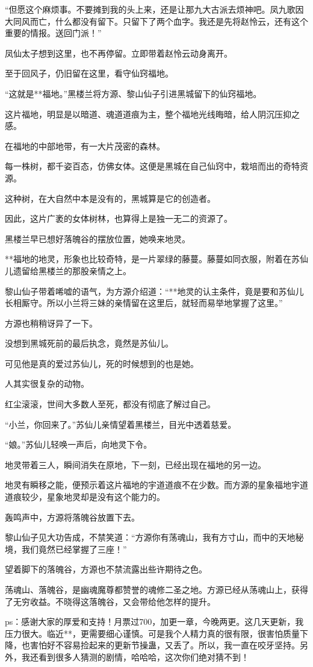 \begin{this_body}
“但愿这个麻烦事。不要摊到我的头上来，还是让那九大古派去烦神吧。凤九歌因大同风而亡，什么都没有留下。只留下了两个血字。我还是先将赵怜云，还有这个重要的情报。送回门派！”

凤仙太子想到这里，也不再停留。立即带着赵怜云动身离开。

至于回风子，仍旧留在这里，看守仙窍福地。

“这就是**福地。”黑楼兰将方源、黎山仙子引进黑城留下的仙窍福地。

这片福地，明显是以暗道、魂道道痕为主，整个福地光线晦暗，给人阴沉压抑之感。

在福地的中部地带，有一大片茂密的森林。

每一株树，都千姿百态，仿佛女体。这便是黑城在自己仙窍中，栽培而出的奇特资源。

这种树，在大自然中本是没有的，黑城算是它的创造者。

因此，这片广袤的女体树林，也算得上是独一无二的资源了。

黑楼兰早已想好落魄谷的摆放位置，她唤来地灵。

**福地的地灵，形象也比较奇特，是一片翠绿的藤蔓。藤蔓如同衣服，附着在苏仙儿遗留给黑楼兰的那股亲情之上。

黎山仙子带着唏嘘的语气，为方源介绍道：“**地灵的认主条件，竟是要和苏仙儿长相厮守。所以小兰将三妹的亲情留在这里后，就轻而易举地掌握了这里。”

方源也稍稍讶异了一下。

没想到黑城死前的最后执念，竟然是苏仙儿。

可见他是真的爱过苏仙儿，死的时候想到的也是她。

人其实很复杂的动物。

红尘滚滚，世间大多数人至死，都没有彻底了解过自己。

“小兰，你回来了。”苏仙儿亲情望着黑楼兰，目光中透着慈爱。

“娘。”苏仙儿轻唤一声后，向地灵下令。

地灵带着三人，瞬间消失在原地，下一刻，已经出现在福地的另一边。

地灵有瞬移之能，便预示着这片福地的宇道道痕不在少数。而方源的星象福地宇道道痕较少，星象地灵却是没有这个能力的。

轰鸣声中，方源将落魄谷放置下去。

黎山仙子见大功告成，不禁笑道：“方源你有荡魂山，我有方寸山，而中的天地秘境，我们竟然已经掌握了三座！”

望着脚下的落魄谷，方源也不禁流露出些许期待之色。

荡魂山、落魄谷，是幽魂魔尊都赞誉的魂修二圣之地。方源已经从荡魂山上，获得了无穷收益。不晓得这落魄谷，又会带给他怎样的提升。

ps：感谢大家的厚爱和支持！月票过700，加更一章，今晚两更。这几天更新，我压力很大。临近**，更需要细心谨慎。可是我个人精力真的很有限，很害怕质量下降，也害怕好不容易捡起来的更新节操蛊，又丢了。所以，我一直在咬牙坚持。另外，我还看到很多人猜测的剧情，哈哈哈，这次你们绝对猜不到！

\end{this_body}

